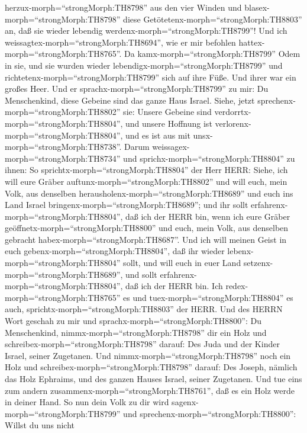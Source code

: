 herzux-morph=``strongMorph:TH8798'' aus den vier Winden und
blasex-morph=``strongMorph:TH8798'' diese
Getötetenx-morph=``strongMorph:TH8803'' an, daß sie wieder lebendig
werdenx-morph=``strongMorph:TH8799''!  Und ich
weissagtex-morph=``strongMorph:TH8694'', wie er mir befohlen
hattex-morph=``strongMorph:TH8765''. Da
kamx-morph=``strongMorph:TH8799'' Odem in sie, und sie wurden wieder
lebendigx-morph=``strongMorph:TH8799'' und
richtetenx-morph=``strongMorph:TH8799'' sich auf ihre Füße. Und ihrer
war ein großes Heer.  Und er
sprachx-morph=``strongMorph:TH8799'' zu mir: Du Menschenkind, diese
Gebeine sind das ganze Haus Israel. Siehe, jetzt
sprechenx-morph=``strongMorph:TH8802'' sie: Unsere Gebeine sind
verdorrtx-morph=``strongMorph:TH8804'', und unsere Hoffnung ist
verlorenx-morph=``strongMorph:TH8804'', und es ist aus mit
unsx-morph=``strongMorph:TH8738''.  Darum
weissagex-morph=``strongMorph:TH8734'' und
sprichx-morph=``strongMorph:TH8804'' zu ihnen: So
sprichtx-morph=``strongMorph:TH8804'' der Herr HERR: Siehe, ich will
eure Gräber auftunx-morph=``strongMorph:TH8802'' und will euch, mein
Volk, aus denselben herausholenx-morph=``strongMorph:TH8689'' und euch
ins Land Israel bringenx-morph=``strongMorph:TH8689'';  und
ihr sollt erfahrenx-morph=``strongMorph:TH8804'', daß ich der HERR bin,
wenn ich eure Gräber geöffnetx-morph=``strongMorph:TH8800'' und euch,
mein Volk, aus denselben gebracht habex-morph=``strongMorph:TH8687''.
 Und ich will meinen Geist in euch
gebenx-morph=``strongMorph:TH8804'', daß ihr wieder
lebenx-morph=``strongMorph:TH8804'' sollt, und will euch in euer Land
setzenx-morph=``strongMorph:TH8689'', und sollt
erfahrenx-morph=``strongMorph:TH8804'', daß ich der HERR bin. Ich
redex-morph=``strongMorph:TH8765'' es und
tuex-morph=``strongMorph:TH8804'' es auch,
sprichtx-morph=``strongMorph:TH8803'' der HERR.  Und des
HERRN Wort geschah zu mir und sprachx-morph=``strongMorph:TH8800'':
 Du Menschenkind, nimmx-morph=``strongMorph:TH8798'' dir
ein Holz und schreibex-morph=``strongMorph:TH8798'' darauf: Des Juda und
der Kinder Israel, seiner Zugetanen. Und
nimmx-morph=``strongMorph:TH8798'' noch ein Holz und
schreibex-morph=``strongMorph:TH8798'' darauf: Des Joseph, nämlich das
Holz Ephraims, und des ganzen Hauses Israel, seiner Zugetanen.
 Und tue eins zum andern
zusammenx-morph=``strongMorph:TH8761'', daß es ein Holz werde in deiner
Hand.  So nun dein Volk zu dir wird
sagenx-morph=``strongMorph:TH8799'' und
sprechenx-morph=``strongMorph:TH8800'': Willst du uns nicht

